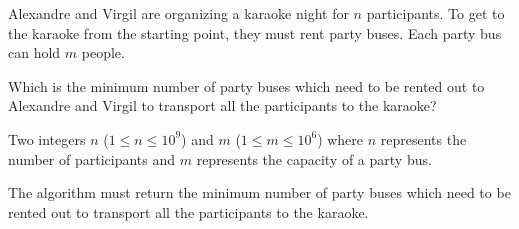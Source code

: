 \problemname{\problemyamlname}


Alexandre and Virgil are organizing a karaoke night for $n$ participants.
To get to the karaoke from the starting point, they must rent party buses.
Each party bus can hold $m$ people.

Which is the minimum number of party buses which need to be rented out to Alexandre and Virgil to transport all the participants to the karaoke?

\begin{Input}
	Two integers $n$ ($1 \le n \le 10^9$) and $m$ ($1 \le m \le 10^6$) where $n$ represents the number of participants and $m$ represents the capacity of a party bus.
\end{Input}

\begin{Output}
	The algorithm must return the minimum number of party buses which need to be rented out to transport all the participants to the karaoke.
\end{Output}
